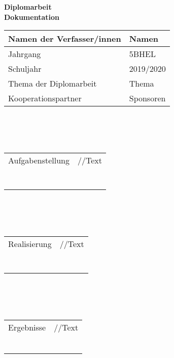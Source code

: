 \begin{center}
	\large \textbf {Diplomarbeit \\ Dokumentation} \normalsize
\end{center}

\noindent
\begin{tabularx}{\textwidth}{|m{}|X|}
	\hline
	Namen der Verfasser/innen & Namen \\
	\hline
	Jahrgang &  5BHEL\\
	Schuljahr & 2019/2020\\
	\hline
	Thema der Diplomarbeit& Thema\\
	\hline
	Kooperationspartner & Sponsoren\\
	\hline

\end{tabularx}
\\
\\
\\
\noindent
\begin{tabularx}{\textwidth}{|m{}|X|}
	\hline
 	Aufgabenstellung & //Text \\
 	&\\
 	&\\
 	&\\
 	&\\
 	&\\
 	&\\
 	&\\
 	
	\hline
	
\end{tabularx}
\\
\\
\\
\noindent
\begin{tabularx}{\textwidth}{|m{}|X|}
	\hline
	Realisierung & //Text \\
	&\\
	&\\
	&\\
	&\\
	&\\
	&\\
	&\\
	
	\hline
	
\end{tabularx}
\\
\\
\\
\noindent
\begin{tabularx}{\textwidth}{|m{}|X|}
	\hline
	Ergebnisse & //Text \\
	&\\
	&\\
	&\\
	&\\
	&\\
	&\\
	
	\hline
	
\end{tabularx}
